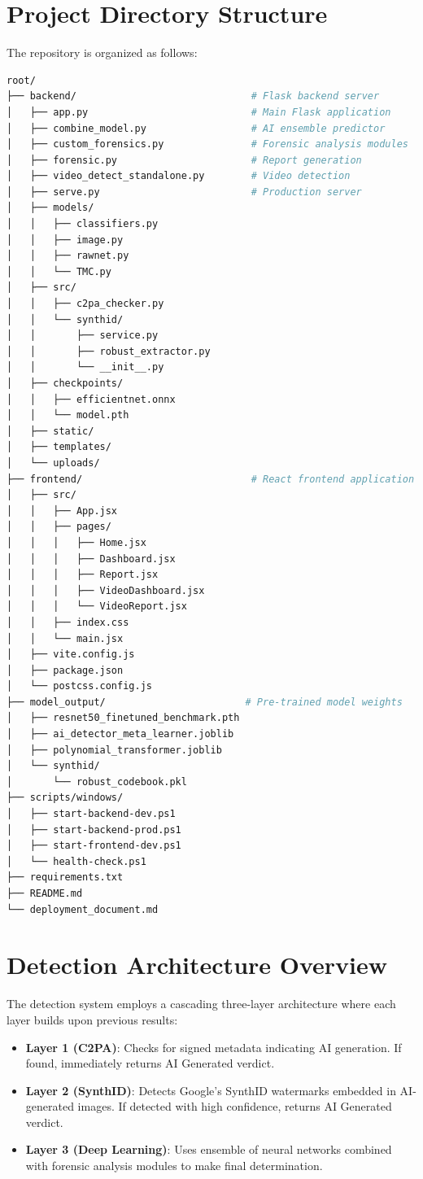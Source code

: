 \documentclass[12pt,a4paper]{book}
\begin{document}
\section{Project Directory Structure}
\label{sec:directory}

The repository is organized as follows:

\begin{lstlisting}[language=bash]
root/
├── backend/                              # Flask backend server
│   ├── app.py                            # Main Flask application
│   ├── combine_model.py                  # AI ensemble predictor
│   ├── custom_forensics.py               # Forensic analysis modules
│   ├── forensic.py                       # Report generation
│   ├── video_detect_standalone.py        # Video detection
│   ├── serve.py                          # Production server
│   ├── models/
│   │   ├── classifiers.py
│   │   ├── image.py
│   │   ├── rawnet.py
│   │   └── TMC.py
│   ├── src/
│   │   ├── c2pa_checker.py
│   │   └── synthid/
│   │       ├── service.py
│   │       ├── robust_extractor.py
│   │       └── __init__.py
│   ├── checkpoints/
│   │   ├── efficientnet.onnx
│   │   └── model.pth
│   ├── static/
│   ├── templates/
│   └── uploads/
├── frontend/                             # React frontend application
│   ├── src/
│   │   ├── App.jsx
│   │   ├── pages/
│   │   │   ├── Home.jsx
│   │   │   ├── Dashboard.jsx
│   │   │   ├── Report.jsx
│   │   │   ├── VideoDashboard.jsx
│   │   │   └── VideoReport.jsx
│   │   ├── index.css
│   │   └── main.jsx
│   ├── vite.config.js
│   ├── package.json
│   └── postcss.config.js
├── model_output/                        # Pre-trained model weights
│   ├── resnet50_finetuned_benchmark.pth
│   ├── ai_detector_meta_learner.joblib
│   ├── polynomial_transformer.joblib
│   └── synthid/
│       └── robust_codebook.pkl
├── scripts/windows/
│   ├── start-backend-dev.ps1
│   ├── start-backend-prod.ps1
│   ├── start-frontend-dev.ps1
│   └── health-check.ps1
├── requirements.txt
├── README.md
└── deployment_document.md
\end{lstlisting}

\section{Detection Architecture Overview}

The detection system employs a cascading three-layer architecture where each layer builds upon previous results:

\begin{itemize}
    \item \textbf{Layer 1 (C2PA)}: Checks for signed metadata indicating AI generation. If found, immediately returns AI Generated verdict.
    \item \textbf{Layer 2 (SynthID)}: Detects Google's SynthID watermarks embedded in AI-generated images. If detected with high confidence, returns AI Generated verdict.
    \item \textbf{Layer 3 (Deep Learning)}: Uses ensemble of neural networks combined with forensic analysis modules to make final determination.
\end{itemize}
\end{document}
